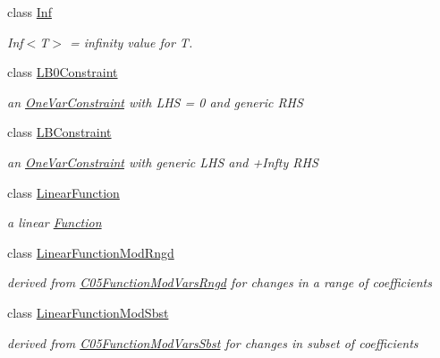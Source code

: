 \begin{DoxyCompactItemize}
class \mbox{\hyperlink{class_s_m_spp__di__unipi__it_1_1_inf}{Inf}}
\begin{DoxyCompactList}\small\item\em Inf$<$\+T$>$ = infinity value for T. \end{DoxyCompactList}\item 
class \mbox{\hyperlink{class_s_m_spp__di__unipi__it_1_1_l_b0_constraint}{L\+B0\+Constraint}}
\begin{DoxyCompactList}\small\item\em an \mbox{\hyperlink{class_s_m_spp__di__unipi__it_1_1_one_var_constraint}{One\+Var\+Constraint}} with L\+HS = 0 and generic R\+HS \end{DoxyCompactList}\item 
class \mbox{\hyperlink{class_s_m_spp__di__unipi__it_1_1_l_b_constraint}{L\+B\+Constraint}}
\begin{DoxyCompactList}\small\item\em an \mbox{\hyperlink{class_s_m_spp__di__unipi__it_1_1_one_var_constraint}{One\+Var\+Constraint}} with generic L\+HS and +\+Infty R\+HS \end{DoxyCompactList}\item 
class \mbox{\hyperlink{class_s_m_spp__di__unipi__it_1_1_linear_function}{Linear\+Function}}
\begin{DoxyCompactList}\small\item\em a linear \mbox{\hyperlink{class_s_m_spp__di__unipi__it_1_1_function}{Function}} \end{DoxyCompactList}\item 
class \mbox{\hyperlink{class_s_m_spp__di__unipi__it_1_1_linear_function_mod_rngd}{Linear\+Function\+Mod\+Rngd}}
\begin{DoxyCompactList}\small\item\em derived from \mbox{\hyperlink{class_s_m_spp__di__unipi__it_1_1_c05_function_mod_vars_rngd}{C05\+Function\+Mod\+Vars\+Rngd}} for changes in a range of coefficients \end{DoxyCompactList}\item 
class \mbox{\hyperlink{class_s_m_spp__di__unipi__it_1_1_linear_function_mod_sbst}{Linear\+Function\+Mod\+Sbst}}
\begin{DoxyCompactList}\small\item\em derived from \mbox{\hyperlink{class_s_m_spp__di__unipi__it_1_1_c05_function_mod_vars_sbst}{C05\+Function\+Mod\+Vars\+Sbst}} for changes in subset of coefficients \end{DoxyCompactList}\item 

\end{DoxyCompactItemize}
